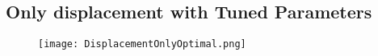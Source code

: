 \documentclass{article}
\begin{document}
\begin{appendices}
\section{Only displacement with Tuned Parameters}
\label{appendix:DisplacementOnlyOpt}
\begin{figure}[!ht]
  \centering
  \texttt{[image: DisplacementOnlyOptimal.png]}  
\end{figure}

\end{appendices}
\newpage


\end{document}
